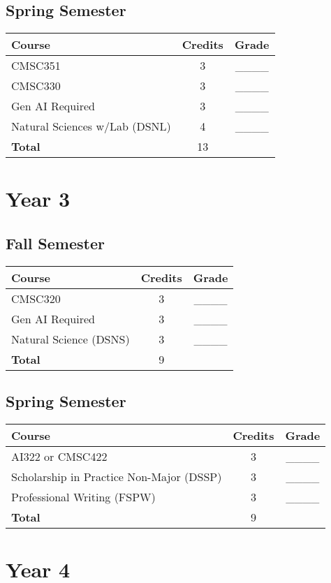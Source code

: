 \subsection*{Spring Semester}
\begin{tabular}{|l|c|c|}
    \hline
    Course & Credits & Grade \\
    \hline
    CMSC351 & 3 & \_\_\_\_ \\
    CMSC330 & 3 & \_\_\_\_ \\
    Gen AI Required & 3 & \_\_\_\_ \\
    Natural Sciences w/Lab (DSNL) & 4 & \_\_\_\_ \\
    \hline
    \textbf{Total} & 13 & \\
    \hline
\end{tabular}

\section*{Year 3}
\subsection*{Fall Semester}
\begin{tabular}{|l|c|c|}
    \hline
    Course & Credits & Grade \\
    \hline
    CMSC320 & 3 & \_\_\_\_ \\
    Gen AI Required & 3 & \_\_\_\_ \\
    Natural Science (DSNS) & 3 & \_\_\_\_ \\
    \hline
    \textbf{Total} & 9 & \\
    \hline
\end{tabular}

\subsection*{Spring Semester}
\begin{tabular}{|l|c|c|}
    \hline
    Course & Credits & Grade \\
    \hline
    AI322 or CMSC422 & 3 & \_\_\_\_ \\
    Scholarship in Practice Non-Major (DSSP) & 3 & \_\_\_\_ \\
    Professional Writing (FSPW) & 3 & \_\_\_\_ \\
    \hline
    \textbf{Total} & 9 & \\
    \hline
\end{tabular}

\section*{Year 4}

